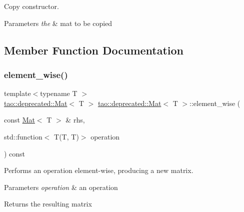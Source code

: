 Copy constructor. 


\begin{DoxyParams}{Parameters}
{\em the} & mat to be copied \\
\hline
\end{DoxyParams}


\subsection{Member Function Documentation}
\mbox{\label{classtao_1_1deprecated_1_1_mat_aac21bbd32c319c0d713d70d398d25ac6}} 
\subsubsection{\texorpdfstring{element\_wise()}{element\_wise()}}
{\footnotesize\ttfamily template$<$typename T $>$ \\
\mbox{\hyperlink{classtao_1_1deprecated_1_1_mat}{tao\+::deprecated\+::\+Mat}}$<$ T $>$ \mbox{\hyperlink{classtao_1_1deprecated_1_1_mat}{tao\+::deprecated\+::\+Mat}}$<$ T $>$\+::element\+\_\+wise (\begin{DoxyParamCaption}\item[{const \mbox{\hyperlink{classtao_1_1deprecated_1_1_mat}{Mat}}$<$ T $>$ \&}]{rhs,  }\item[{std\+::function$<$ T(T, T)$>$}]{operation }\end{DoxyParamCaption}) const}



Performs an operation element-\/wise, producing a new matrix. 


\begin{DoxyParams}{Parameters}
{\em operation} & an operation \\
\hline
\end{DoxyParams}
\begin{DoxyReturn}{Returns}
the resulting matrix 
\end{DoxyReturn}
\mbox{\label{classtao_1_1deprecated_1_1_mat_a3971a152a53ee034437c562a6963478a}} 
